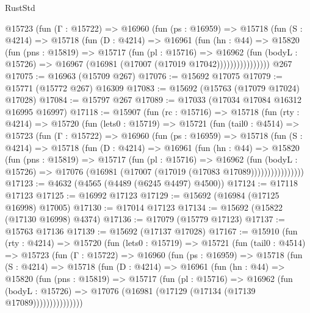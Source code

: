 \begin{lexlean}{RustStd}
\begin{coremodule}
            @15723
              (fun (Γ : @15722) =>
              @16960
                (fun (ps : @16959) =>
                @15718
                  (fun (S : @4214) =>
                  @15718
                    (fun (D : @4214) =>
                    @16961
                      (fun (hn : @44) =>
                      @15820
                        (fun (pns : @15819) =>
                        @15717
                          (fun (pl : @15716) =>
                          @16962
                            (fun (bodyL : @15726) =>
                            @16967 (@16981 (@17007 (@17019 @17042))))))))))))))))
    @267
@17075 := @16963 (@15709 @267)
@17076 := @15692 @17075
@17079 := @15771 (@15772 @267) @16309
@17083 := @15692 (@15763 (@17079 @17024) @17028)
@17084 := @15797 @267
@17089 := @17033 (@17034 @17084 @16312 @16995 @16997)
@17118 := @15907
    (fun (rc : @15716) =>
    @15718
      (fun (rty : @4214) =>
      @15720
        (fun (lets0 : @15719) =>
        @15721
          (fun (tail0 : @4514) =>
          @15723
            (fun (Γ : @15722) =>
            @16960
              (fun (ps : @16959) =>
              @15718
                (fun (S : @4214) =>
                @15718
                  (fun (D : @4214) =>
                  @16961
                    (fun (hn : @44) =>
                    @15820
                      (fun (pns : @15819) =>
                      @15717
                        (fun (pl : @15716) =>
                        @16962
                          (fun (bodyL : @15726) =>
                          @17076 (@16981 (@17007 (@17019 (@17083 @17089))))))))))))))))
@17123 := @4632 (@4565 (@4489 (@6245 @4497) @4500))
@17124 := @17118 @17123
@17125 := @16992 @17123
@17129 := @15692 (@16984 (@17125 @16998) @17005)
@17130 := @17014 @17123
@17134 := @15692 (@15822 (@17130 @16998) @4374)
@17136 := @17079 (@15779 @17123)
@17137 := @15763 @17136
@17139 := @15692 (@17137 @17028)
@17167 := @15910
    (fun (rty : @4214) =>
    @15720
      (fun (lets0 : @15719) =>
      @15721
        (fun (tail0 : @4514) =>
        @15723
          (fun (Γ : @15722) =>
          @16960
            (fun (ps : @16959) =>
            @15718
              (fun (S : @4214) =>
              @15718
                (fun (D : @4214) =>
                @16961
                  (fun (hn : @44) =>
                  @15820
                    (fun (pns : @15819) =>
                    @15717
                      (fun (pl : @15716) =>
                      @16962
                        (fun (bodyL : @15726) =>
                        @17076 (@16981 (@17129 (@17134 (@17139 @17089)))))))))))))))

\end{coremodule}
\end{lexlean}
